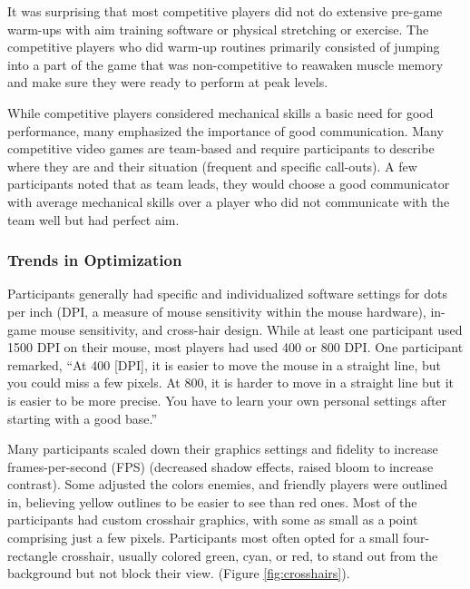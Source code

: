 \documentclass[11pt,manuscript,screen,review]{acmart} %
\begin{document}
It was surprising that most competitive players did not do extensive pre-game warm-ups with aim training software or physical stretching or exercise. The competitive players who did warm-up routines primarily consisted of jumping into a part of the game that was non-competitive to reawaken muscle memory and make sure they were ready to perform at peak levels.

While competitive players considered mechanical skills a basic need for good performance, many emphasized the importance of good communication. Many competitive video games are team-based and require participants to describe where they are and their situation (frequent and specific call-outs). A few participants noted that as team leads, they would choose a good communicator with average mechanical skills over a player who did not communicate with the team well but had perfect aim.

\subsubsection{Trends in Optimization}

Participants generally had specific and individualized software settings for dots per inch (DPI, a measure of mouse sensitivity within the mouse hardware), in-game mouse sensitivity, and cross-hair design. While at least one participant used 1500 DPI on their mouse, most players had used 400 or 800 DPI. One participant remarked, “At 400 [DPI], it is easier to move the mouse in a straight line, but you could miss a few pixels. At 800, it is harder to move in a straight line but it is easier to be more precise. You have to learn your own personal settings after starting with a good base.” 

Many participants scaled down their graphics settings and fidelity to increase frames-per-second (FPS) (decreased shadow effects, raised bloom to increase contrast). Some adjusted the colors enemies, and friendly players were outlined in, believing yellow outlines to be easier to see than red ones. Most of the participants had custom crosshair graphics, with some as small as a point comprising just a few pixels. Participants most often opted for a small four-rectangle crosshair, usually colored green, cyan, or red, to stand out from the background but not block their view. (Figure \ref{fig:crosshairs}). 
\end{document}
